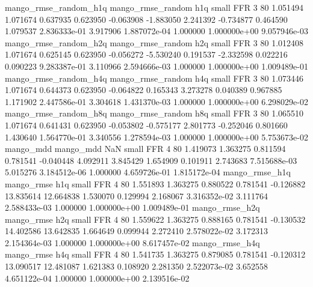mango_rmse_random_h1q mango_rmse_random                  h1q      small      FFR                 3 80 1.051494       1.071674 0.637935       0.623950   -0.063908     -1.883050      2.241392    -0.734877       0.464590  1.079537 2.836333e-01     3.917906   1.887072e-04            1.000000    1.000000e+00        9.057946e-03
mango_rmse_random_h2q mango_rmse_random                  h2q      small      FFR                 3 80 1.012408       1.071674 0.625145       0.623950   -0.056272     -5.530240      0.191537    -2.332598       0.022216  0.090223 9.283387e-01     3.110966   2.594666e-03            1.000000    1.000000e+00        1.009489e-01
mango_rmse_random_h4q mango_rmse_random                  h4q      small      FFR                 3 80 1.073446       1.071674 0.644373       0.623950   -0.064822      0.165343      3.273278     0.040389       0.967885  1.171902 2.447586e-01     3.304618   1.431370e-03            1.000000    1.000000e+00        6.298029e-02
mango_rmse_random_h8q mango_rmse_random                  h8q      small      FFR                 3 80 1.065510       1.071674 0.641431       0.623950   -0.053802     -0.575177      2.801773    -0.252046       0.801660  1.430640 1.564770e-01     3.340556   1.278594e-03            1.000000    1.000000e+00        5.753673e-02
            mango_mdd         mango_mdd                  NaN      small      FFR                 4 80 1.419073       1.363275 0.811594       0.781541   -0.040448      4.092911      3.845429     1.654909       0.101911  2.743683 7.515688e-03     5.015276   3.184512e-06            1.000000    4.659726e-01        1.815172e-04
       mango_rmse_h1q        mango_rmse                  h1q      small      FFR                 4 80 1.551893       1.363275 0.880522       0.781541   -0.126882     13.835614     12.664838     1.530070       0.129994  2.168067 3.316352e-02     3.111764   2.588433e-03            1.000000    1.000000e+00        1.009489e-01
       mango_rmse_h2q        mango_rmse                  h2q      small      FFR                 4 80 1.559622       1.363275 0.888165       0.781541   -0.130532     14.402586     13.642835     1.664649       0.099944  2.272410 2.578022e-02     3.172313   2.154364e-03            1.000000    1.000000e+00        8.617457e-02
       mango_rmse_h4q        mango_rmse                  h4q      small      FFR                 4 80 1.541735       1.363275 0.879085       0.781541   -0.120312     13.090517     12.481087     1.621383       0.108920  2.281350 2.522073e-02     3.652558   4.651122e-04            1.000000    1.000000e+00        2.139516e-02
